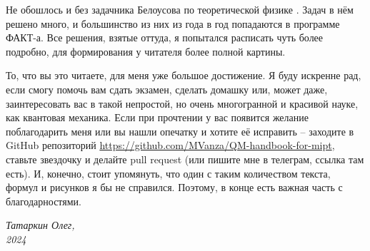 Не обошлось и без задачника Белоусова по теоретической физике \cite{Белоусов}. Задач в нём решено много, и большинство из них из года в год попадаются в программе ФАКТ-а. Все решения, взятые оттуда, я попытался расписать чуть более подробно, для формирования у читателя более полной картины.

То, что вы это читаете, для меня уже большое достижение. Я буду искренне рад, если смогу помочь вам сдать экзамен, сделать домашку или, может даже, заинтересовать вас в такой непростой, но очень многогранной и красивой науке, как квантовая механика. Если при прочтении у вас появится желание поблагодарить меня или вы нашли опечатку и хотите её исправить -- заходите в GitHub репозиторий \url{https://github.com/MVanza/QM-handbook-for-mipt}, ставьте звездочку и делайте pull request (или пишите мне в телеграм, ссылка там есть). И, конечно, стоит упомянуть, что один с таким количеством текста, формул и рисунков я бы не справился. Поэтому, в конце есть важная часть с благодарностями.
\vspace{1em}
\begin{flushright}
    \textit{Татаркин Олег,}\\
    \textit{2024}
\end{flushright}
